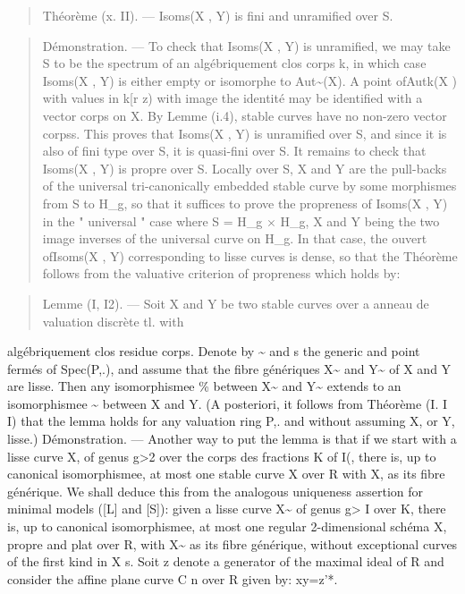 \documentclass[11pt]{article}
\theoremstyle{plain}
\theoremstyle{definition}
\theoremstyle{remark}
\begin{document}
\begin{quote}Th\'eor\`eme (x. II). --- Isoms(X , Y) is fini and unramified over S.\end{quote}
\begin{quote}D\'emonstration. --- To check that Isoms(X , Y) is unramified, we may take S to be the spectrum of an alg\'ebriquement clos corps k, in which case Isoms(X , Y) is either empty or isomorphe to Aut\textasciitilde{}(X). A point ofAutk(X ) with values in k[r z) with image the identit\'e may be identified with a vector corps on X. By Lemme (i.4), stable curves have no non-zero vector corpss. This proves that Isoms(X , Y) is unramified over S, and since it is also of fini type over S, it is quasi-fini over S. It remains to check that Isoms(X , Y) is propre over S. Locally over S, X and Y are the pull-backs of the universal tri-canonically embedded stable curve by some morphismes from S to H\_g, so that it suffices to prove the propreness of Isoms(X , Y) in the " universal " case where S = H\_g $\times$ H\_g, X and Y being the two image inverses of the universal curve on H\_g. In that case, the ouvert ofIsoms(X , Y) corresponding to lisse curves is dense, so that the Th\'eor\`eme follows from the valuative criterion of propreness which holds by:\end{quote}
\begin{quote}Lemme (I, I2). --- Soit X and Y be two stable curves over a anneau de valuation discr\`ete tl. with\end{quote}
alg\'ebriquement clos residue corps. Denote by \textasciitilde{} and s the generic and point ferm\'es of Spec(P,.), and assume that the fibre g\'en\'eriques X\textasciitilde{} and Y\textasciitilde{} of X and Y are lisse. Then any isomorphismee \% between X\textasciitilde{} and Y\textasciitilde{} extends to an isomorphismee \textasciitilde{} between X and Y. (A posteriori, it follows from Th\'eor\`eme (I. I I) that the lemma holds for any valuation ring P,. and without assuming X, or Y, lisse.) D\'emonstration. --- Another way to put the lemma is that if we start with a lisse curve X, of genus g>2 over the corps des fractions K of I(, there is, up to canonical isomorphismee, at most one stable curve X over R with X, as its fibre g\'en\'erique. We shall deduce this from the analogous uniqueness assertion for minimal models ([L] and [S]): given a lisse curve X\textasciitilde{} of genus g> I over K, there is, up to canonical isomorphismee, at most one regular 2-dimensional sch\'ema X, propre and plat over R, with X\textasciitilde{} as its fibre g\'en\'erique, without exceptional curves of the first kind in X s. Soit z denote a generator of the maximal ideal of R and consider the affine plane curve C n over R given by: xy=z'*.
\end{document}
